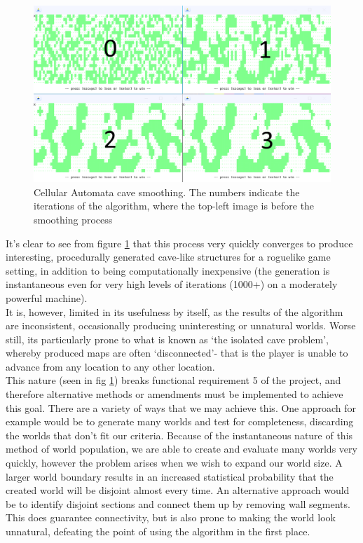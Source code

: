 \documentclass[12pt,a4paper]{article}
\begin{document}
\begin{figure}[h]
  \centering
 	\includegraphics[scale=0.5]{images/cellauto.png}
	\caption[]{Cellular Automata cave smoothing. The numbers indicate the iterations of the algorithm, where the top-left image is before the smoothing process}
	\label{fig:fig3}
\end{figure}

It's clear to see from figure \ref{fig:fig3} that this process very quickly converges to produce interesting, procedurally generated cave-like structures for a roguelike game setting, in addition to being computationally inexpensive (the generation is instantaneous even for very high levels of iterations (1000+) on a moderately powerful machine). \\

It is, however, limited in its usefulness by itself, as the results of the algorithm are inconsistent, occasionally producing uninteresting or unnatural worlds. Worse still, its particularly prone to what is known as `the isolated cave problem', whereby produced maps are often `disconnected'- that is the player is unable to advance from any location to any other location. \\

This nature (seen in fig \ref{fig:fig3}) breaks functional requirement 5 of the project, and therefore alternative methods or amendments must be implemented to achieve this goal. There are a variety of ways that we may achieve this. One approach for example would be to generate many worlds and test for completeness, discarding the worlds that don't fit our criteria. Because of the instantaneous nature of this method of world population, we are able to create and evaluate many worlds very quickly, however the problem arises when we wish to expand our world size. A larger world boundary results in an increased statistical probability that the created world will be disjoint almost every time. An alternative approach would be to identify disjoint sections and connect them up by removing wall segments. This does guarantee connectivity, but is also prone to making the world look unnatural, defeating the point of using the algorithm in the first place. \\
\end{document}
